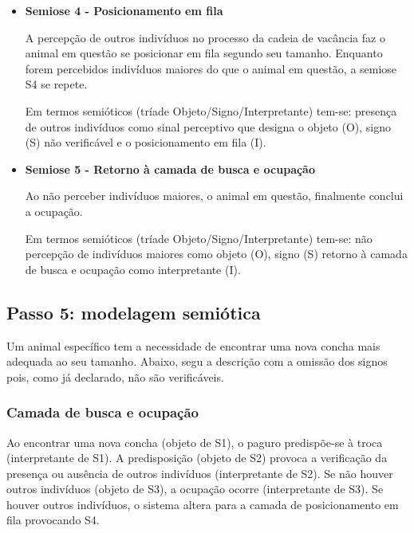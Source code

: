 \begin{itemize}
	\item \textbf{Semiose 4 - Posicionamento em fila}

	A percepção de outros indivíduos no processo da cadeia de vacância faz o animal em questão se posicionar em fila segundo seu tamanho. Enquanto forem percebidos indivíduos maiores do que o animal em questão, a semiose S4 se repete.

	Em termos semióticos (tríade Objeto/Signo/Interpretante) tem-se: presença de outros indivíduos como sinal perceptivo que designa o objeto (O), signo (S) não verificável e o posicionamento em fila (I).



	\item \textbf{Semiose 5 - Retorno à camada de busca e ocupação}

	Ao não perceber indivíduos maiores, o animal em questão, finalmente conclui a ocupação.

	Em termos semióticos (tríade Objeto/Signo/Interpretante) tem-se: não percepção de indivíduos maiores como objeto (O), signo (S) retorno à camada de busca e ocupação como interpretante (I).



\end{itemize}

\subsection{Passo 5: modelagem semiótica}

Um animal específico tem a necessidade de encontrar uma nova concha mais adequada ao seu tamanho. Abaixo, segu a descrição com a omissão dos signos pois, como já declarado, não são verificáveis.

\subsubsection*{Camada de busca e ocupação}

Ao encontrar uma nova concha (objeto de S1), o paguro predispõe-se à troca (interpretante de S1). A predisposição (objeto de S2) provoca a verificação da presença ou ausência de outros indivíduos (interpretante de S2). Se não houver outros indivíduos (objeto de S3), a ocupação ocorre (interpretante de S3). Se houver outros indivíduos, o sistema altera para a camada de posicionamento em fila provocando S4.

